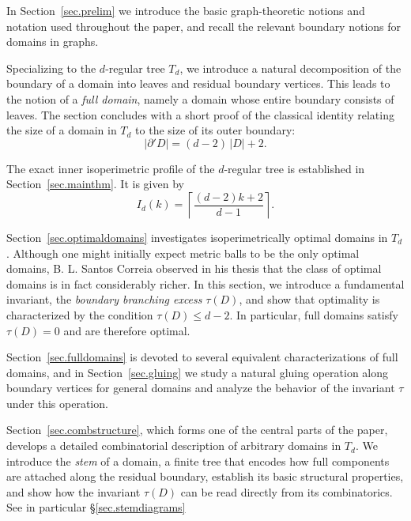 \documentclass[a4paper, 11pt]{article}
\numberwithin{equation}{section}
\theoremstyle{definition}
\theoremstyle{remark}
\begin{document}
In Section~\ref{sec.prelim} we introduce the basic graph-theoretic notions and notation used throughout the paper, and recall the relevant boundary notions for domains in graphs. 

\smallskip 

Specializing to the $d$-regular tree $T_d$, we introduce a natural decomposition
of the boundary of a domain into leaves and residual boundary vertices.
This leads to the notion of a \emph{full domain}, namely a domain whose entire
boundary consists of leaves.
The section concludes with a short proof of the classical identity relating the
size of a domain in $T_d$ to the size of its outer boundary:
\[
   |\partial' D| = (d-2)\,|D| + 2 .
\]

\smallskip 

The exact inner isoperimetric profile of the $d$-regular tree is established in Section~\ref{sec.mainthm}. It is given by
$$
   I_d(k) = \left\lceil \frac{(d-2)k + 2}{d-1} \right\rceil.
$$

\smallskip 

Section~\ref{sec.optimaldomains} investigates isoperimetrically optimal domains in $T_d$. Although one might initially expect metric balls to be the only optimal domains, B. L. Santos Correia observed in his thesis that the class of optimal domains is in fact considerably richer. In this section, we introduce a fundamental invariant, the \textit{boundary branching excess} $\tau(D)$, and show that optimality is characterized by the condition $\tau(D)\le d-2$. In particular, full domains satisfy $\tau(D)=0$ and are therefore optimal.


\smallskip 

Section~\ref{sec.fulldomains} is devoted to several equivalent characterizations
of full domains, and in Section~\ref{sec.gluing} we study a natural gluing
operation along boundary vertices for general domains and analyze the behavior
of the invariant $\tau$ under this operation.

\smallskip 

Section~\ref{sec.combstructure}, which forms one of the central parts of the paper, develops a detailed combinatorial description of arbitrary domains in
$T_d$.
We introduce the \emph{stem} of a domain, a finite tree that encodes how full components are attached along the residual boundary, establish its basic structural properties, and show how the invariant $\tau(D)$ can be read directly from its combinatorics. See in particular \S\ref{sec.stemdiagrams}
 
\end{document}
